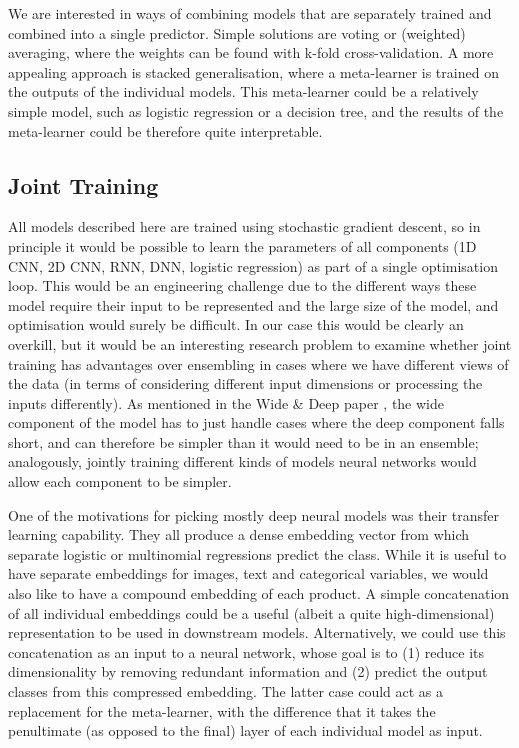We are interested in ways of combining models that are separately trained and combined into a single predictor.
Simple solutions are voting or (weighted) averaging, where the weights can be found with k-fold cross-validation.
A more appealing approach is stacked generalisation, where a meta-learner is trained on the outputs of the individual models.
This meta-learner could be a relatively simple model, such as logistic regression or a decision tree, and the results of the meta-learner could be therefore quite interpretable.

\subsection{Joint Training}
All models described here are trained using stochastic gradient descent, so in principle it would be possible to learn the parameters of all components (1D CNN, 2D CNN, RNN, DNN, logistic regression) as part of a single optimisation loop.
This would be an engineering challenge due to the different ways these model require their input to be represented and the large size of the model, and optimisation would surely be difficult.
In our case this would be clearly an overkill, but it would be an interesting research problem to examine whether joint training has advantages over ensembling in cases where we have different views of the data (in terms of considering different input dimensions or processing the inputs differently).
As mentioned in the Wide \& Deep paper \cite{wide_deep}, the wide component of the model has to just handle cases where the deep component falls short, and can therefore be simpler than it would need to be in an ensemble; analogously, jointly training different kinds of models neural networks would allow each component to be simpler.

One of the motivations for picking mostly deep neural models was their transfer learning capability.
They all produce a dense embedding vector from which separate logistic or multinomial regressions predict the class.
While it is useful to have separate embeddings for images, text and categorical variables, we would also like to have a compound embedding of each product.
A simple concatenation of all individual embeddings could be a useful (albeit a quite high-dimensional) representation to be used in downstream models.
Alternatively, we could use this concatenation as an input to a neural network, whose goal is to (1) reduce its dimensionality by removing redundant information and (2) predict the output classes from this compressed embedding.
The latter case could act as a replacement for the meta-learner, with the difference that it takes the penultimate (as opposed to the final) layer of each individual model as input.


